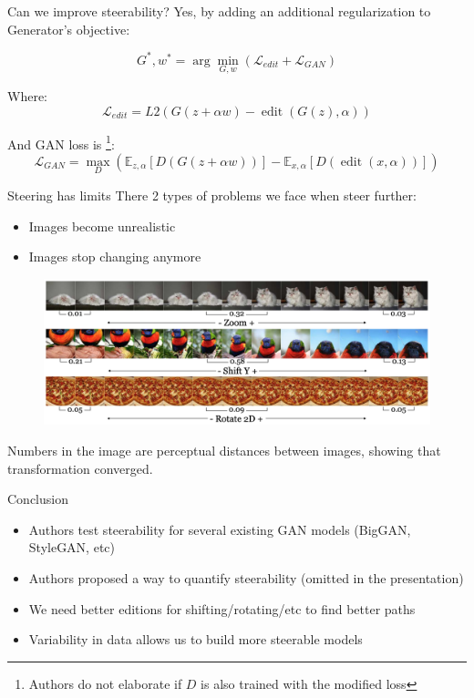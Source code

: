 \documentclass[10pt]{beamer}
\begin{document}
\begin{frame}{Can we improve steerability?}
\pause Yes, by adding an additional regularization to Generator's objective:

\begin{equation}
G^{*}, w^{*}=\arg \min_{G, w}\left(\mathcal{L}_{e d i t}+\mathcal{L}_{G A N}\right)
\end{equation}

Where:
\begin{equation}
\mathcal{L}_{e d i t}=L 2(G(z+\alpha w)-\operatorname{edit}(G(z), \alpha))
\end{equation}

And GAN loss is \footnote{Authors do not elaborate if $D$ is also trained with the modified loss}:
\begin{equation}
\mathcal{L}_{G A N}=\max _{D}\left(\mathbb{E}_{z, \alpha}[D(G(z+\alpha w))]-\mathbb{E}_{x, \alpha}[D(\operatorname{edit}(x, \alpha))]\right)
\end{equation}
\end{frame}


\begin{frame}{Steering has limits}
    There 2 types of problems we face when steer further:
    \begin{itemize}
        \item\pause Images become unrealistic
        \item\pause Images stop changing anymore
    \end{itemize}
    
    \begin{figure}
        \centering
        \includegraphics[width=\textwidth]{images/gan-steerability-failures.png}
    \end{figure}
    
    Numbers in the image are perceptual distances between images, showing that transformation converged.
\end{frame}

\begin{frame}{Conclusion}
    \begin{itemize}
        \item\pause Authors test steerability for several existing GAN models (BigGAN, StyleGAN, etc)
        \item\pause Authors proposed a way to quantify steerability (omitted in the presentation)
        \item\pause We need better editions for shifting/rotating/etc to find better paths
        \item\pause Variability in data allows us to build more steerable models
    \end{itemize}
\end{frame}
\end{document}
